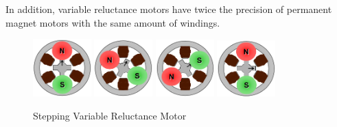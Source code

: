 In addition, variable reluctance motors have twice the precision of 
permanent magnet motors with 
the same amount of windings.
\begin{figure}[htp]
    \begin{center}
    \includegraphics[width=0.2\textwidth]{figures/move/motor19.png}
    \hfill
    \includegraphics[width=0.2\textwidth]{figures/move/motor20.png}
    \hfill
    \includegraphics[width=0.2\textwidth]{figures/move/motor21.png}
  	\hfill
  	\includegraphics[width=0.2\textwidth]{figures/move/motor22.png}
	\end{center}
	\begin{center}
    \hfill
    \hfill
  	\hfill
  	\caption{Stepping Variable Reluctance Motor} \cite{figures}
  	\label{fig:stepping_var_rel}
  	\end{center}
\end{figure}
